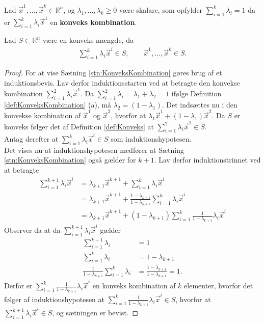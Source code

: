 


\begin{defn}
Lad $\vec{x}^1, ...,\vec{x}^k \in \mathds{R}^n$, og $\lambda_1,..., \lambda_k \geq 0 $ være skalare, som opfylder $\sum_{i=1}^k \lambda_i =1$ da er $\sum_{i=1}^k \lambda_i \vec{x}^1$ en \textbf{konveks kombination}.
\label{def:KonveksKombination}
\end{defn}

\begin{stn}
Lad $S\subset \mathds{R}^n$ være en konveks mængde, da
\begin{align*}
	\sum_{i=1}^k \lambda_i \vec{x}^i \in S, \qquad \vec{x}^1, ...,\vec{x}^k \in S.
\end{align*}
\label{stn:KonveksKombination}
\end{stn}

\begin{proof}
For at vise Sætning \ref{stn:KonveksKombination} gøres brug af et induktionsbevis.
Lav derfor induktionsstarten ved at betragte den konvekse kombination $\sum_{i=1}^2 \lambda_i \vec{x}^1$.
Da $\sum_{i=1}^2 \lambda_i = \lambda_1 + \lambda_2 = 1$ ifølge Definition \ref{def:KonveksKombination} (a), må $\lambda_2 = (1 - \lambda_1)$.
Det indsættes nu i den konvekse kombination af $\vec{x}^1$ og $\vec{x}^2$, hvorfor at $\lambda_1 \vec{x}^1+ (1-\lambda_1) \vec{x}^2$.
Da $S$ er konveks følger det af Definition \ref{def:Konveks} at $\sum_{i=1}^2 \lambda_i \vec{x}^1 \in S$.
\\Antag derefter at $\sum_{i=1}^k \lambda_i \vec{x}^i \in S$ som induktionshypotesen.
\\ Det vises nu at induktionshypotesen medfører at Sætning \ref{stn:KonveksKombination} også gælder for $k+1$.
Lav derfor induktionstrinnet ved at betragte 
\begin{align*}
	\sum_{i=1}^{k+1} \lambda_i \vec{x}^i &= \lambda_{k+1}\vec{x}^{k+1} + \sum_{i=1}^k \lambda_i \vec{x}^i
	\\ &= \lambda_{k+1}\vec{x}^{k+1} + \frac{1-\lambda_{k+1}}{1-\lambda_{k+1}} \sum_{i=1}^k \lambda_i \vec{x}^i
	\\ &= \lambda_{k+1}\vec{x}^{k+1} + (1-\lambda_{k+1}) \sum_{i=1}^k \frac{1}{1-\lambda_{k+1}} \lambda_i \vec{x}^i
\end{align*}
Observer da at da $\sum_{i=1}^{k+1} \lambda_i \vec{x}^i $ gælder
\begin{align*}
	\sum_{i=1}^{k+1} \lambda_i  & = 1
	\\ \sum_{i=1}^{k} \lambda_i &= 1 - \lambda_{k+1}
	\\ \frac{1}{1-\lambda_{k+1}} \sum_{i=1}^{k} \lambda_i &= \frac{1-\lambda_{k+1}}{1-\lambda_{k+1}} = 1.
\end{align*}
Derfor er $\sum_{i=1}^k \frac{1}{1-\lambda_{k+1}} \lambda_i \vec{x}^i$ en konveks kombination af $k$ elementer, hvorfor det følger af induktionshypotesen at $\sum_{i=1}^k \frac{1}{1-\lambda_{k+1}} \lambda_i \vec{x}^i \in S$, hvorfor at $\sum_{i=1}^{k+1} \lambda_i \vec{x}^i \in S$, og sætningen er bevist.
\end{proof}


